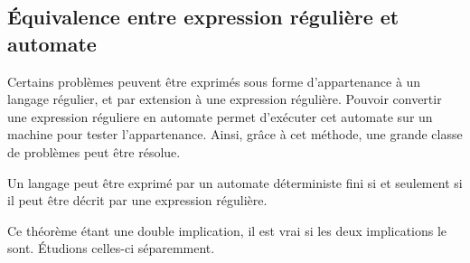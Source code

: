 \subsection{Équivalence entre expression régulière et automate}\label{ss:e-a}

Certains problèmes peuvent être exprimés sous forme d'appartenance à un langage régulier, et par extension à une expression régulière.
Pouvoir convertir une expression réguliere en automate permet d'exécuter cet automate sur un machine pour tester l'appartenance. Ainsi, grâce à cet méthode, une grande classe de problèmes peut être résolue.


\begin{theorem}
	Un langage peut être exprimé par un automate déterministe fini si et seulement si il peut être décrit par une expression régulière.
\end{theorem}

Ce théorème étant une double implication, il est vrai si les deux implications le sont. Étudions celles-ci séparemment.


